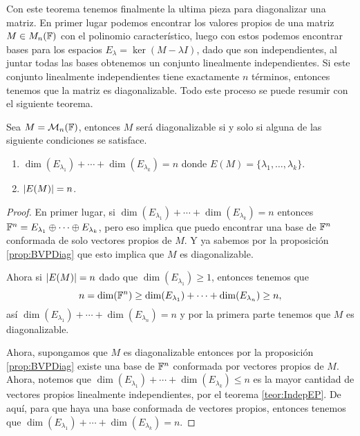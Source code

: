 Con este teorema tenemos finalmente la ultima pieza para diagonalizar una matriz. En primer lugar podemos encontrar los valores propios de una matriz $M\in M_n(\mathbb{F})$ con el polinomio característico, luego con estos podemos encontrar bases para los espacios $E_\lambda = \ker(M-\lambda I)$, dado que son independientes, al juntar todas las bases obtenemos un conjunto linealmente independientes. Si este conjunto linealmente independientes tiene exactamente $n$ términos, entonces tenemos que la matriz es diagonalizable. Todo este proceso se puede resumir con el siguiente teorema.

\begin{teor}\label{teor:DiagCond}
  Sea $M = \mathcal{M}_n(\mathbb{F})$, entonces $M$ será diagonalizable si y solo si alguna de las siguiente condiciones se satisface.
  \begin{enumerate}
    \item $\dim(E_{\lambda_1}) + \cdots + \dim(E_{\lambda_k}) = n$ donde $E(M) = \{\lambda_1, \ldots, \lambda_k\}$.
    \item $\mathopen|E(M)\mathclose| = n$.
  \end{enumerate}
\end{teor}
\begin{proof}
  En primer lugar, si $\dim(E_{\lambda_1}) + \cdots + \dim(E_{\lambda_k}) = n$ entonces $\mathbb{F}^n = E_{\lambda_1} \oplus \cdots \oplus E_{\lambda_k}$, pero eso implica que puedo encontrar una base de $\mathbb{F}^n$ conformada de solo vectores propios de $M$. Y ya sabemos por la proposición \ref{prop:BVPDiag} que esto implica que $M$ es diagonalizable.

  Ahora si $\mathopen|E(M)\mathclose| = n$ dado que $\dim(E_{\lambda_1}) \geq 1$, entonces tenemos que
  \[ n = \dim(\mathbb{F}^n) \geq \dim(E_{\lambda_1}) + \cdots + \dim(E_{\lambda_n}) \geq n, \]
  así $\dim(E_{\lambda_1}) + \cdots + \dim(E_{\lambda_n}) = n$ y por la primera parte tenemos que $M$ es diagonalizable.

  Ahora, supongamos que $M$ es diagonalizable entonces por la proposición \ref{prop:BVPDiag} existe una base de $\mathbb{F}^n$ conformada por vectores propios de $M$. Ahora, notemos que $\dim(E_{\lambda_1}) + \cdots + \dim(E_{\lambda_k}) \leq n$ es la mayor cantidad de vectores propios linealmente independientes, por el teorema \ref{teor:IndepEP}. De aquí, para que haya una base conformada de vectores propios, entonces tenemos que $\dim(E_{\lambda_1}) + \cdots + \dim(E_{\lambda_k}) = n$.
\end{proof}


